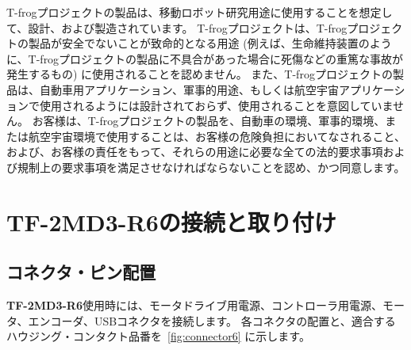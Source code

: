 \documentclass[11pt,a4j,openany,fleqn]{jbook}
\begin{document}
T-frogプロジェクトの製品は、移動ロボット研究用途に使用することを想定して、設計、および製造されています。
T-frogプロジェクトは、T-frogプロジェクトの製品が安全でないことが致命的となる用途 (例えば、生命維持装置のように、T-frogプロジェクトの製品に不具合があった場合に死傷などの重篤な事故が発生するもの) に使用されることを認めません。
また、T-frogプロジェクトの製品は、自動車用アプリケーション、軍事的用途、もしくは航空宇宙アプリケーションで使用されるようには設計されておらず、使用されることを意図していません。
お客様は、T-frogプロジェクトの製品を、自動車の環境、軍事的環境、または航空宇宙環境で使用することは、お客様の危険負担においてなされること、および、お客様の責任をもって、それらの用途に必要な全ての法的要求事項および規制上の要求事項を満足させなければならないことを認め、かつ同意します。
\par



\newpage
\section{{\bf TF-2MD3-R6}の接続と取り付け}
\label{sec:モータドライバの接続}

\subsection{コネクタ・ピン配置}
\label{sec:コネクタ}

{\bf TF-2MD3-R6}使用時には、モータドライブ用電源、コントローラ用電源、モータ、エンコーダ、USBコネクタを接続します。
各コネクタの配置と、適合するハウジング・コンタクト品番を\figurename~\ref{fig:connector6} に示します。
\par
\end{document}
